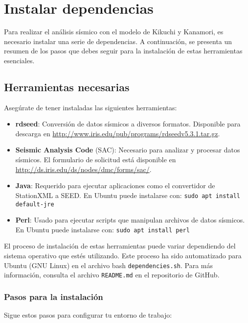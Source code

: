 \documentclass[a4paper,11pt]{refart}
\begin{document}
\section{Instalar dependencias}

Para realizar el análisis sísmico con el modelo de Kikuchi y Kanamori, es necesario instalar una serie de dependencias. A continuación, se presenta un resumen de los pasos que debes seguir para la instalación de estas herramientas esenciales.

\subsection{Herramientas necesarias}

Asegúrate de tener instaladas las siguientes herramientas:

\begin{itemize}
\item \textbf{rdseed}: Conversión de datos sísmicos a diversos formatos. Disponible para descarga en \url{http://www.iris.edu/pub/programs/rdseedv5.3.1.tar.gz}.
\item \textbf{Seismic Analysis Code} (SAC): Necesario para analizar y procesar datos sísmicos. El formulario de solicitud está disponible en \url{http://ds.iris.edu/ds/nodes/dmc/forms/sac/}.
\item \textbf{Java}: Requerido para ejecutar aplicaciones como el convertidor de StationXML a SEED. En Ubuntu puede instalarse con: \texttt{sudo apt install default-jre}
\item \textbf{Perl}: Usado para ejecutar scripts que manipulan archivos de datos sísmicos. En Ubuntu puede instalarse con: \texttt{sudo apt install perl}
\end{itemize}

\begin{leftbar}
  El proceso de instalación de estas herramientas puede variar dependiendo del sistema operativo que estés utilizando. Este proceso ha sido automatizado para Ubuntu (GNU Linux) en el archivo bash \texttt{dependencies.sh}. Para más información, consulta el archivo \texttt{README.md} en el repositorio de GitHub.
\end{leftbar}

\subsubsection{Pasos para la instalación}

Sigue estos pasos para configurar tu entorno de trabajo:
\end{document}
